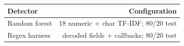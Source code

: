 \begin{tabular}{lr}
\toprule
Detector & Configuration \\
\midrule
Random forest & 18 numeric + char TF-IDF; 80/20 test \\
Regex harness & decoded fields + callbacks; 80/20 test \\
\bottomrule
\end{tabular}
